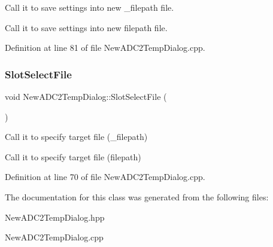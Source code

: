 Call it to save settings into new \+\_\+filepath file. 

Call it to save settings into new filepath file. 

Definition at line 81 of file New\+A\+D\+C2\+Temp\+Dialog.\+cpp.

\mbox{\label{class_new_a_d_c2_temp_dialog_aecb2c340ccb0c4ceb395ba688c092317}} 
\subsubsection{\texorpdfstring{Slot\+Select\+File}{SlotSelectFile}}
{\footnotesize\ttfamily void New\+A\+D\+C2\+Temp\+Dialog\+::\+Slot\+Select\+File (\begin{DoxyParamCaption}{ }\end{DoxyParamCaption})\hspace{0.3cm}{\ttfamily [slot]}}



Call it to specify target file (\+\_\+filepath) 

Call it to specify target file (filepath) 

Definition at line 70 of file New\+A\+D\+C2\+Temp\+Dialog.\+cpp.



The documentation for this class was generated from the following files\+:\begin{DoxyCompactItemize}
\item 
New\+A\+D\+C2\+Temp\+Dialog.\+hpp\item 
New\+A\+D\+C2\+Temp\+Dialog.\+cpp\end{DoxyCompactItemize}
